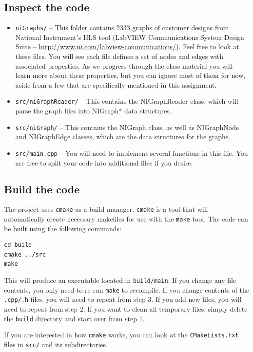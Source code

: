 \subsection{Inspect the code}
\begin{itemize}
	\item {\tt niGraphs/} -- This folder contains 2333 graphs of customer designs from National Instrument's HLS tool (LabVIEW Communications System Design Suite -- \url{http://www.ni.com/labview-communications/}).  Feel free to look at these files.  You will see each file defines a set of nodes and edges with associated properties.  As we progress through the class material you will learn more about these properties, but you can ignore most of them for now, aside from a few that are specifically mentioned in this assignment.
	\item {\tt src/niGraphReader/} -- This contains the NIGraphReader class, which will parse the graph files into NIGraph* data structures.
	\item {\tt src/niGraph/} -- This contains the NIGraph class, as well as NIGraphNode and NIGraphEdge classes, which are the data structures for the graphs.
	\item {\tt src/main.cpp} -- You will need to implement several functions in this file.  You are free to split your code into additional files if you desire.
\end{itemize}

\subsection{Build the code}
The project uses {\tt cmake} as a build manager.  {\tt cmake} is a tool that will automatically create necessary makefiles for use with the {\tt make} tool.
The code can be built using the following commands:
\begin{lstlisting}
cd build
cmake ../src
make
\end{lstlisting}

This will produce an executable located in \texttt{build/main}.  If you change any file contents, you only need to re-run \texttt{make} to recompile.
If you change contents of the {\tt .cpp/.h} files, you will need to repeat from step 3.  If you add new files, you will need to repeat from step 2.  If you want to clean all temporary files, simply delete the {\tt build} directory and start over from step 1.
	
If you are interested in how {\tt cmake} works, you can look at the {\tt CMakeLists.txt} files in {\tt src/} and its subdirectories.
	

